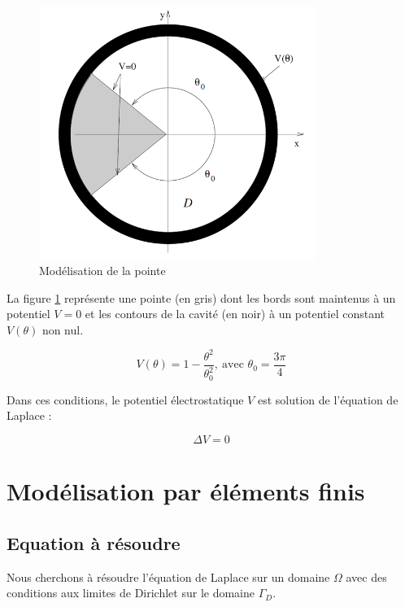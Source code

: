 \documentclass{article}
\begin{document}
\begin{figure}[!h]
    \centering
    \includegraphics[width=0.8\textwidth]{img/schema.png}
    \caption{Modélisation de la pointe}
    \label{fig:pointe}
\end{figure}

\hspace{0.5cm}
La figure \ref{fig:pointe} représente une pointe (en gris) dont les bords sont
maintenus à un potentiel $V=0$ et les contours de la cavité (en noir) à
un potentiel constant $V(\theta)$ non nul.

\begin{equation}
    V(\theta) = 1 - \frac{\theta^2}{\theta_0^2},
    \ \text{avec } \theta_0=\frac{3\pi}{4}
\end{equation}

Dans ces conditions, le potentiel électrostatique $V$ est solution de l'équation
de Laplace :

\begin{equation}
    \Delta V = 0
\end{equation}

\newpage

\section{Modélisation par éléments finis}

\subsection{Equation à résoudre}

\hspace{0.5cm}
Nous cherchons à résoudre l'équation de Laplace sur un domaine $\Omega$ avec des
conditions aux limites de Dirichlet sur le domaine $\Gamma_D$.
\end{document}
